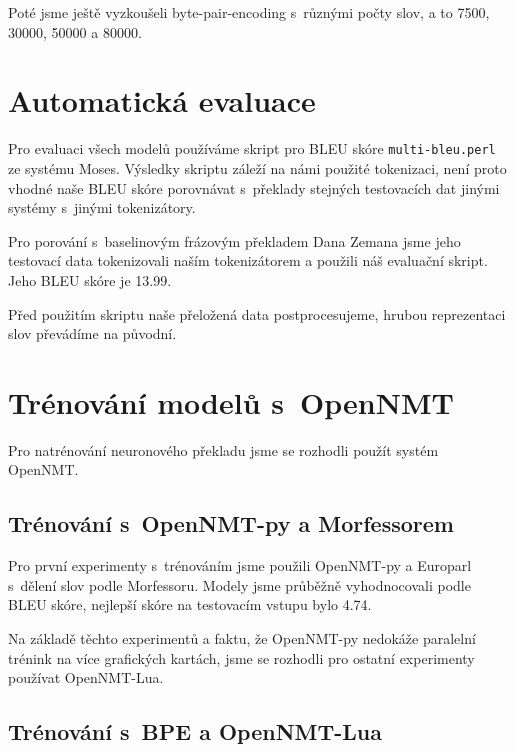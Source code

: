 \documentclass[a4]{article}
\begin{document}
Poté jsme ještě vyzkoušeli
byte-pair-encoding s~různými počty slov, a to 7500, 30000, 50000 a 80000.


\section{Automatická evaluace}

Pro evaluaci všech modelů používáme skript pro BLEU skóre \texttt{multi-bleu.perl} ze systému
Moses\cite{moses}. Výsledky skriptu záleží na námi použité tokenizaci, není
proto vhodné naše BLEU skóre porovnávat
s~překlady stejných testovacích dat jinými systémy s~jinými tokenizátory.

Pro porování s~baselinovým frázovým překladem Dana Zemana jsme jeho
testovací data tokenizovali naším tokenizátorem a použili náš evaluační
skript. Jeho BLEU skóre je 13.99.

Před použitím skriptu naše přeložená data postprocesujeme, hrubou reprezentaci
slov převádíme na původní.

\section{Trénování modelů s~OpenNMT}

Pro natrénování neuronového překladu jsme se rozhodli použít systém
OpenNMT\cite{opennmt}. 
%
%
%
%
%
%
%
%



\subsection{Trénování s~OpenNMT-py a Morfessorem}

Pro první experimenty s~trénováním jsme použili OpenNMT-py a Europarl s~dělení slov
podle Morfessoru. Modely jsme průběžně vyhodnocovali podle
BLEU skóre, nejlepší skóre na testovacím vstupu bylo 4.74.

Na základě těchto experimentů a faktu, že OpenNMT-py nedokáže paralelní
trénink na více grafických kartách, jsme se rozhodli pro ostatní
experimenty používat OpenNMT-Lua.

\subsection{Trénování s~BPE a OpenNMT-Lua}
\end{document}
